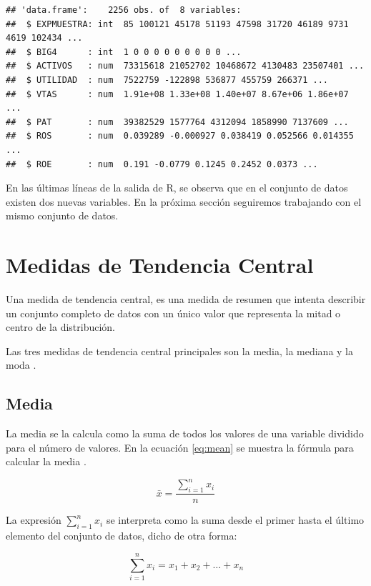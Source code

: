 \documentclass[letterpaper,]{book}
\begin{document}
\begin{verbatim}
## 'data.frame':    2256 obs. of  8 variables:
##  $ EXPMUESTRA: int  85 100121 45178 51193 47598 31720 46189 9731 4619 102434 ...
##  $ BIG4      : int  1 0 0 0 0 0 0 0 0 0 ...
##  $ ACTIVOS   : num  73315618 21052702 10468672 4130483 23507401 ...
##  $ UTILIDAD  : num  7522759 -122898 536877 455759 266371 ...
##  $ VTAS      : num  1.91e+08 1.33e+08 1.40e+07 8.67e+06 1.86e+07 ...
##  $ PAT       : num  39382529 1577764 4312094 1858990 7137609 ...
##  $ ROS       : num  0.039289 -0.000927 0.038419 0.052566 0.014355 ...
##  $ ROE       : num  0.191 -0.0779 0.1245 0.2452 0.0373 ...
\end{verbatim}

En las últimas líneas de la salida de R, se observa que en el conjunto de datos existen dos nuevas variables. En la próxima sección seguiremos trabajando con el mismo conjunto de datos.

\hypertarget{tendcentr}{%
\section{Medidas de Tendencia Central}\label{tendcentr}}

Una medida de tendencia central, es una medida de resumen que intenta describir un conjunto completo de datos con un único valor que representa la mitad o centro de la distribución.

Las tres medidas de tendencia central principales son la media, la mediana y la moda \citep{devore2012_2}.

\hypertarget{media}{%
\subsection{Media}\label{media}}

La media se la calcula como la suma de todos los valores de una variable dividido para el número de valores. En la ecuación \eqref{eq:mean} se muestra la fórmula para calcular la media \citep{macfarland2014}.

\begin{equation} 
  \bar{x} = \dfrac{\sum_{i=1}^{n}x_i}{n}
  \label{eq:mean}
\end{equation}

La expresión \(\sum_{i=1}^{n} x_i\) se interpreta como la suma desde el primer hasta el último elemento del conjunto de datos, dicho de otra forma:

\begin{equation} 
  \sum_{i=1}^{n} x_i = x_1 + x_2 + \ldots + x_n 
  \label{eq:sum}
\end{equation}
\end{document}
